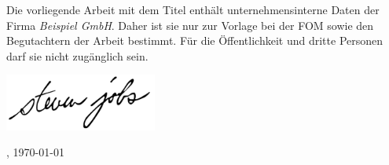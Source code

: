     Die vorliegende Arbeit mit dem Titel \textit{\metaTitel} enthält unternehmensinterne Daten der Firma \textit{Beispiel GmbH}.
    Daher ist sie nur zur Vorlage bei der FOM sowie den Begutachtern der Arbeit bestimmt.
    Für die Öffentlichkeit und dritte Personen darf sie nicht zugänglich sein.
    \newline

    \begin{flushright}
        \includegraphics[width=5cm]{abbildungen/unterschrift.png}
    \end{flushright}
    \begin{minipage}{0.48\textwidth}
        \begin{flushleft}
            \metaOrt{}, \today
        \end{flushleft}
    \end{minipage}
    \begin{minipage}{0.48\textwidth}
        \begin{flushright}
            \metaAutor{}
        \end{flushright}
    \end{minipage}
